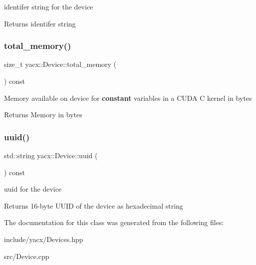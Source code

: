 identifer string for the device \begin{DoxyReturn}{Returns}
identifer string 
\end{DoxyReturn}
\mbox{\label{classyacx_1_1_device_a14acbcda1fdf398b018ee329406b9c7b}} 
\subsubsection{\texorpdfstring{total\+\_\+memory()}{total\_memory()}}
{\footnotesize\ttfamily size\+\_\+t yacx\+::\+Device\+::total\+\_\+memory (\begin{DoxyParamCaption}{ }\end{DoxyParamCaption}) const\hspace{0.3cm}{\ttfamily [inline]}}

Memory available on device for {\bfseries constant} variables in a C\+U\+DA C kernel in bytes \begin{DoxyReturn}{Returns}
Memory in bytes 
\end{DoxyReturn}
\mbox{\label{classyacx_1_1_device_a1fcf245197f59b939e36c24771ee07d3}} 
\subsubsection{\texorpdfstring{uuid()}{uuid()}}
{\footnotesize\ttfamily std\+::string yacx\+::\+Device\+::uuid (\begin{DoxyParamCaption}{ }\end{DoxyParamCaption}) const\hspace{0.3cm}{\ttfamily [inline]}}

uuid for the device \begin{DoxyReturn}{Returns}
16-\/byte U\+U\+ID of the device as hexadecimal string 
\end{DoxyReturn}


The documentation for this class was generated from the following files\+:\begin{DoxyCompactItemize}
\item 
include/yacx/Devices.\+hpp\item 
src/Device.\+cpp\end{DoxyCompactItemize}
